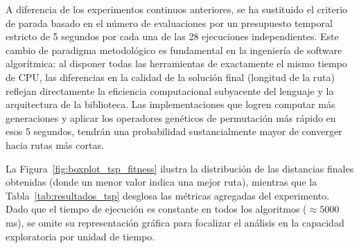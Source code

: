 \documentclass[12pt,a4paper,twoside,openright]{book}
\begin{document}
    A diferencia de los experimentos continuos anteriores, se ha sustituido el criterio de parada basado en el número de evaluaciones por un presupuesto temporal estricto de 5 segundos por cada una de las 28 ejecuciones independientes. Este cambio de paradigma metodológico es fundamental en la ingeniería de software algorítmica: al disponer todas las herramientas de exactamente el mismo tiempo de CPU, las diferencias en la calidad de la solución final (longitud de la ruta) reflejan directamente la eficiencia computacional subyacente del lenguaje y la arquitectura de la biblioteca. Las implementaciones que logren computar más generaciones y aplicar los operadores genéticos de permutación más rápido en esos 5 segundos, tendrán una probabilidad sustancialmente mayor de converger hacia rutas más cortas.

    La Figura~\ref{fig:boxplot_tsp_fitness} ilustra la distribución de las distancias finales obtenidas (donde un menor valor indica una mejor ruta), mientras que la Tabla~\ref{tab:resultados_tsp} desglosa las métricas agregadas del experimento. Dado que el tiempo de ejecución es constante en todos los algoritmos ($\approx 5000$ ms), se omite su representación gráfica para focalizar el análisis en la capacidad exploratoria por unidad de tiempo.
\end{document}
